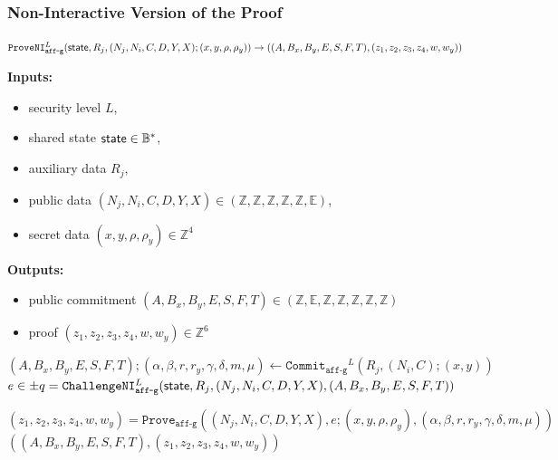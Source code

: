 \documentclass[11pt]{article}
\newenvironment{inlineAlgorithm}{}{}
\newcommand{\algoName}[1]{#1 \par}
\newcommand{\algoInputsList}[1]{
    {\small \bf Inputs:} 
        \begin{itemize}[noitemsep,topsep=0pt]
            #1
        \end{itemize}
}
\newcommand{\algoOutputsList}[1]{
    {\small \bf Outputs:}
        \begin{itemize}[noitemsep,topsep=0pt]
            #1
        \end{itemize}
}
\def\state{{\sf state}}
\newcommand{\commit}[1]{\ensuremath{\mathtt{Commit}_{\mathtt{#1}}}}
\newcommand{\challengeni}[1]{\ensuremath{\mathtt{ChallengeNI}_{\mathtt{#1}}}}
\newcommand{\prove}[1]{\ensuremath{\mathtt{Prove}_{\mathtt{#1}}}}
\newcommand{\proveni}[1]{\ensuremath{\mathtt{ProveNI}_{\mathtt{#1}}}}
\newcommand{\E}{\mathbb{E}}
\newcommand{\Z}{\mathbb{Z}}
\newcommand{\?}[1]{\stackrel{?}{#1}}
\newcommand{\Byte}{\ensuremath{\mathbb{B}}}
\begin{document}
\subsubsection{Non-Interactive Version of the Proof}

\begin{description}

\item
\begin{inlineAlgorithm}
\algoName{$\proveni{aff\mbox{-}g}^L(
    \state,
    R_j,
    (N_j, N_i, C, D, Y, X);
    (x, y, \rho, \rho_y)
) \to (
    (A, B_x, B_y, E, S, F, T),
    (z_1, z_2, z_3, z_4, w, w_y)
)$}
\algoInputsList{
    \item security level $L$,
    \item shared state $\state \in \Byte^*$,
    \item auxiliary data $R_j$,
    \item public data $(N_j, N_i, C, D, Y, X) \in (\Z, \Z, \Z, \Z, \Z, \E)$,
    \item secret data $(x, y, \rho, \rho_y) \in \Z^4$
}
\algoOutputsList{
    \item public commitment $(A, B_x, B_y, E, S, F, T) \in (\Z, \E, \Z, \Z, \Z, \Z, \Z)$
    \item proof $(z_1, z_2, z_3, z_4, w, w_y) \in \Z^6$
}
\begin{algorithmic}[1]
\State $(A, B_x, B_y, E, S, F, T);
        (\alpha, \beta, r, r_y, \gamma, \delta, m, \mu)
        \gets \commit{aff\mbox{-}g}^L(R_j, (N_i, C); (x, y))$
\State $e \in \pm q = \challengeni{aff\mbox{-}g}^L(
    \state,
    R_j,
    (N_j, N_i, C, D, Y, X),
    (A, B_x, B_y, E, S, F, T)
)$

\Comment{$q = |\E|$}
\State $(z_1, z_2, z_3, z_4, w, w_y) = \prove{aff\mbox{-}g}(
    (N_j, N_i, C, D, Y, X),
    e;
    (x, y, \rho, \rho_y),
    (\alpha, \beta, r, r_y, \gamma, \delta, m, \mu)
)$
\State \Return $(
    (A, B_x, B_y, E, S, F, T),
    (z_1, z_2, z_3, z_4, w, w_y)
)$
\end{algorithmic}
\end{inlineAlgorithm}


\end{description}
\end{document}
